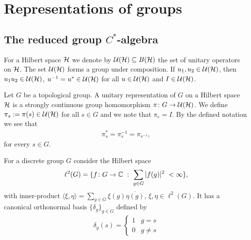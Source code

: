 \chapter{Representations of groups}

\section{The reduced group $C^*$-algebra}
For a Hilbert space $\mathcal{H}$ we denote by $\mathcal{U}(\mathcal{H})\subseteq B(\mathcal{H})$ the set of unitary operators on $\mathcal{H}$. The set $\mathcal{U}(\mathcal{H})$ forms a group under composition. If $u_{1},u_{2} \in \mathcal{U}(\mathcal{H})$, then $u_{1}u_{2} \in \mathcal{U}(\mathcal{H})$, $u^{-1}=u^* \in \mathcal{U}(\mathcal{H})$ for all $u \in \mathcal{U}(\mathcal{H})$ and $I\in \mathcal{U}(\mathcal{H})$. 

\begin{definition}
Let $G$ be a topological group. A unitary representation of $G$ on a Hilbert space $\mathcal{H}$ is a strongly continuous group homomorphism $\pi \colon G \to \mathcal{U}(\mathcal{H})$. We define $\pi_{s}:=\pi(s) \in \mathcal{U}(\mathcal{H})$ for all $s \in G$ and we note that $\pi_{e}=I$. By the defined notation we see that
\begin{align*}
\pi_s^*=\pi_s^{-1}=\pi_{s^{-1}},
\end{align*} 
for every $s \in G$.
\end{definition}

\noindent For a discrete group $G$ consider the Hilbert space 
\begin{align*}
\ell^2(G)= \{ f \colon G \to \mathbb{C} \ : \ \sum_{g \in G} |f(g)|^2\ < \infty\},
\end{align*}
with inner-product  $ \langle \xi , \eta \rangle = \sum_{g \in G} \xi(g) \overline{\eta(g)}$, $\xi,\eta \in \ell^2(G)$. It has a canonical orthonormal basis $\{ \delta_{g}\}_{g \in G}$ defined by
\begin{align*}
\delta_{g}(s)=\begin{cases}
1 & g=s\\
0 & g \neq s
\end{cases}
\end{align*}

